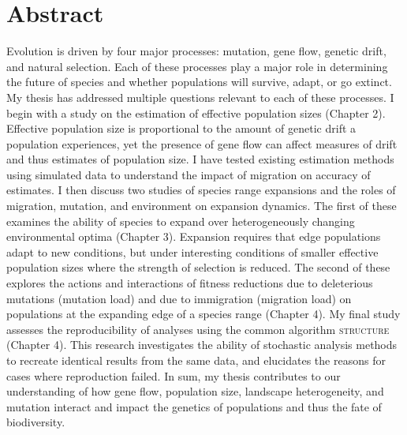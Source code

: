\chapter*{Abstract}

Evolution is driven by four major processes: mutation, gene flow, genetic drift, and natural selection. Each of these processes play a major role in determining the future of species and whether populations will survive, adapt, or go extinct. My thesis has addressed multiple questions relevant to each of these processes. I begin with a study on the estimation of effective population sizes (Chapter 2). Effective population size is proportional to the amount of genetic drift a population experiences, yet the presence of gene flow can affect measures of drift and thus estimates of population size. I have tested existing estimation methods using simulated data to understand the impact of migration on accuracy of estimates. I then discuss two studies of species range expansions and the roles of migration, mutation, and environment on expansion dynamics. The first of these examines the ability of species to expand over heterogeneously changing environmental optima (Chapter 3). Expansion requires that edge populations adapt to new conditions, but under interesting conditions of smaller effective population sizes where the strength of selection is reduced. The second of these explores the actions and interactions of fitness reductions due to deleterious mutations (mutation load) and due to immigration (migration load) on populations at the expanding edge of a species range (Chapter 4). My final study assesses the reproducibility of analyses using the common algorithm \textsc{structure} (Chapter 4). This research investigates the ability of stochastic analysis methods to recreate identical results from the same data, and elucidates the reasons for cases where reproduction failed. In sum, my thesis contributes to our understanding of how gene flow, population size, landscape heterogeneity, and mutation interact and impact the genetics of populations and thus the fate of biodiversity.

